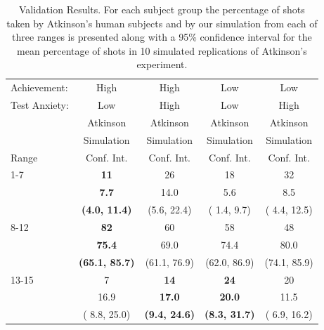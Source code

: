 \begin{table}[ht]
\begin{center}

\begin{tabular}{|l||c|c|c|c|} \hline
Achievement: & High & High & Low & Low \\
Test Anxiety: & Low & High & Low & High \\  \hline
 & Atkinson & Atkinson & Atkinson & Atkinson \\
 & Simulation & Simulation & Simulation & Simulation \\
Range & Conf. Int. & Conf. Int. & Conf. Int. & Conf. Int. \\ \hline\hline
  1-7 & \bf{11}           & 26              & 18           & 32 \\
      & \bf{7.7}          & 14.0            &  5.6         &  8.5 \\
      & \bf{(4.0, 11.4)}  & (5.6, 22.4)     & ( 1.4,  9.7) & ( 4.4, 12.5)\\ \hline
8-12  & \bf{82}           & 60               & 58           & 48 \\
      & \bf{75.4}         & 69.0             & 74.4         & 80.0 \\
      & \bf{(65.1, 85.7)} & (61.1, 76.9)     & (62.0, 86.9) & (74.1, 85.9)\\ \hline
13-15 & 7                 & \bf{14}           & \bf{24}           & 20 \\
      & 16.9              & \bf{17.0}         & \bf{20.0}         & 11.5 \\
      & ( 8.8, 25.0)      & \bf{(9.4, 24.6)}  & \bf{(8.3, 31.7)} & ( 6.9, 16.2)\\ \hline
\end{tabular}
\caption{Validation Results.  For each subject group the percentage of shots taken by Atkinson's human subjects and by our simulation from each of three ranges is presented along with a 95\% confidence interval for the mean percentage of shots in 10 simulated replications of Atkinson's experiment.}
\label{tab:results}

\end{center}
\end{table}

